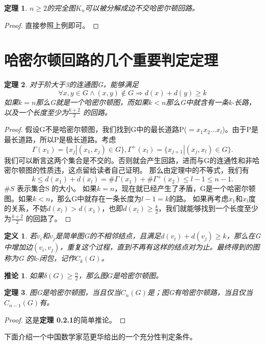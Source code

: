 \documentclass[11pt,a4paper,openany]{book}
\newtheorem{theorem}{\textbf{定理}}[section]
\newtheorem{defination}{\textbf{定义}}[section]
\newtheorem{coro}{\textbf{推论}}[section]
\begin{document}
\begin{theorem} {\K $n\geq 2$的完全图$K_n$可以被分解成边不交哈密尔顿回路。}\end{theorem}
\begin{proof} 直接参照上例即可。 \end{proof}

\section{哈密尔顿回路的几个重要判定定理}
\begin{theorem} {\K 对于阶大于3的连通图G，能够满足$$\forall x, y \in G \wedge (x,y) \notin G \Rightarrow d(x)+d(y)\geq k$$
如果$k=n$那么G就是一个哈密尔顿图，而如果$k<n$那么G中就含有一条k-长路，以及一个长度至少为$\frac{k+2}{2}$ 的回路。}\end{theorem}
\begin{proof} 假设G不是哈密尔顿图，我们找到G中的最长道路P($=x_1x_2\dots x_l$)。由于P是最长道路，所以P是极长道路。考虑$$\Gamma(x_1)=\{x_j|(x_1, x_j) \in G\}, \Gamma^{+}(x_l)=\{x_{j+1}|(x_j, x_l) \in G\}.$$
我们可以断言这两个集合是不交的。否则就会产生回路，进而与G的连通性和非哈密尔顿图的性质违，这点留给读者自己证明。
那么由定理中的不等式，我们有$$k \leq d(x_1)+d(x_l)=\#\Gamma(x_1)+\#\Gamma^{+}(x_2)\leq l-1 \leq n-1.$$$\#S$ 表示集合S 的大小。
如果$k=n$，现在就已经产生了矛盾，G是一个哈密尔顿图。如果$k<n$，那么G中就存在一条长度为$l-1=k$的路。
如果再考虑$x_1$和$x_l$度的关系，不妨$d(x_l)>d(x_1)$，也即$d(x_l)\geq\frac{k}{2}$，我们就能够找到一个长度至少为$\frac{k+2}{2}$ 的回路了。\end{proof}

\begin{defination} \K 若$v_i$和$v_j$是简单图G的不相邻结点，且满足$d(v_i)+d(v_j)\geq k$，那么在G中增加边$(v_i, v_j)$，重复这个过程，直到不再有这样的结点对为止。最终得到的图称为G 的k-闭包，记作$C_k(G)$。\end{defination}

\begin{coro} \K 如果$\delta(G)\geq \frac{n}{2}$，那么图$G$是哈密尔顿图。\end{coro}

\begin{theorem} \K 图G是哈密尔顿图，当且仅当$C_n(G)$是；图G有哈密尔顿路，当且仅当$C_{n-1}(G)$有。\end{theorem}
\begin{proof} 这是\textbf{定理 0.2.1}的简单推论。\end{proof}

下面介绍一个中国数学家范更华给出的一个充分性判定条件。
\end{document}

